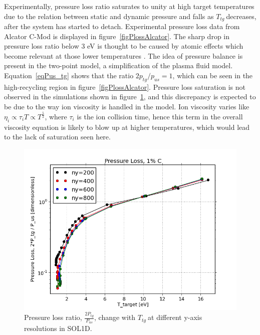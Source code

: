 \documentclass[12pt]{article}  %
\providecommand{\Ttg}{$T_{tg}~$} %
\begin{document}
Experimentally, pressure loss ratio saturates to unity at high target temperatures due to the relation between static and dynamic pressure and falls as \Ttg decreases, after the system has started to detach. Experimental pressure loss data from Alcator C-Mod is displayed in figure~\ref{figPlossAlcator}. The sharp drop in pressure loss ratio below 3 eV is thought to be caused by atomic effects which become relevant at those lower temperatures \cite{Pitcher1997}. The idea of pressure balance is present in the two-point model, a simplification of the plasma fluid model. Equation~\ref{eqPus_tg} shows that the ratio $2p_{tg}/p_{us} = 1$, which can be seen in the high-recycling region in figure~\ref{figPlossAlcator}. Pressure loss saturation is not observed in the simulations shown in figure~\ref{figPL_IMPCOMBO2logy}, and this discrepancy is expected to be due to the way ion viscosity is handled in the model. Ion viscosity varies like $\eta_i \propto \tau_i T \propto T^{\frac{5}{2}}$, where $\tau_i$ is the ion collision time, hence this term in the overall viscosity equation is likely to blow up at higher temperatures, which would lead to the lack of saturation seen here. 

\begin{figure}
\includegraphics[scale=0.7]{Figures/sol1d/PL_IMPCOMBO2logy.png}
\centering
\caption{Pressure loss ratio, $\frac{2P_{tg}}{P_{us}}$, change with \Ttg at different y-axis resolutions in SOL1D.}\label{figPL_IMPCOMBO2logy}
\end{figure}
\end{document}
